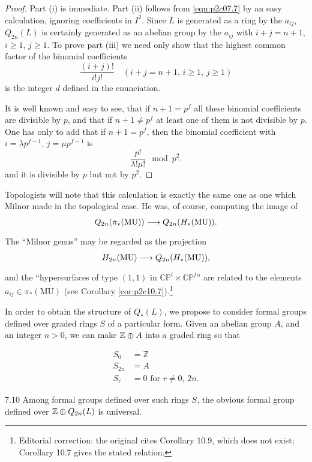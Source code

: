 \documentclass[../main]{subfiles}
\begin{document}
\begin{proof}
Part (i) is immediate. Part (ii) follows from \eqref{eqn:p2c07.7} by an easy calculation, ignoring coefficients in $I^2$. Since $L$ is generated as a ring by the $a_{ij}$, $Q_{2n}(L)$ is certainly generated as an abelian group by the $a_{ij}$ with $i + j = n + 1$, $i \ge 1$, $j \ge 1$. To prove part (iii) we need only show that the highest common factor of the binomial coefficients \[\frac {(i+j)!} {i! j!} \quad (i + j = n + 1, \, i \ge 1, \, j \ge 1)\] is the integer $d$ defined in the enunciation.

It is well known and easy to see, that if $n + 1 = p^f$ all these binomial coefficients are divisible by $p$, and that if $n + 1 \ne p^f$ at least one of them is not divisible by $p$. One has only to add that if $n + 1 = p^f$, then the binomial coefficient with $i = \lambda p^{f - 1}$, $j = \mu p^{f - 1}$ is \[\frac {p!} {\lambda! \mu!} \mod p^2.\] and it is divisible by $p$ but not by $p^2$.
\end{proof}

Topologists will note that this calculation is exactly the same one as one which Milnor made in the topological case. He was, of course, computing the image of \[Q_{2n}(\pi_\ast(\mathrm{MU})) \lar{} Q_{2n}(H_\ast(\mathrm{MU})).\] The ``Milnor genus'' may be regarded as the projection \[H_{2n}(\mathrm{MU}) \lar{} Q_{2n}(H_\ast(\mathrm{MU})),\] and the ``hypersurfaces of type $(1,1)$ in $\mathbb {CP}^i \times \mathbb {CP}^j$'' are related to the elements $a_{ij} \in \pi_\ast(\mathrm{MU})$ (see Corollary \ref{cor:p2c10.7}).\footnote{Editorial correction: the original cites Corollary 10.9, which does not exist; Corollary 10.7 gives the stated relation.}

In order to obtain the structure of $Q_\ast(L)$, we propose to consider formal groups defined over graded rings $S$ of a particular form. Given an abelian group $A$, and an integer $n > 0$, we can make $\mathbb{Z} \oplus A$ into a graded ring so that 

\begin{align*}
S_0 & = \mathbb Z \\ S_{2n} & = A \\ S_r & = 0 \text { for } r \ne 0, \, 2n.
\end{align*}

\begin{customlemma}{7.10}
\label{lem:p2c07.10}
Among formal groups defined over such rings $S$, the obvious formal group defined over $\mathbb{Z} \oplus Q_{2n}(L)$ is universal.
\end{customlemma}
\end{document}
